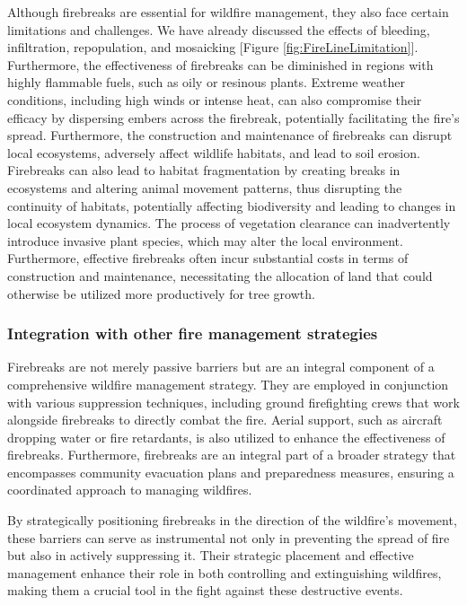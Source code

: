 \documentclass[
  12 pt,
]{Nemilov}
\begin{document}
Although firebreaks are essential for wildfire management, they also face certain limitations and challenges. We have already discussed the effects of bleeding, infiltration, repopulation, and mosaicking {[}Figure \ref{fig:FireLineLimitation}{]}. Furthermore, the effectiveness of firebreaks can be diminished in regions with highly flammable fuels, such as oily or resinous plants. Extreme weather conditions, including high winds or intense heat, can also compromise their efficacy by dispersing embers across the firebreak, potentially facilitating the fire's spread. Furthermore, the construction and maintenance of firebreaks can disrupt local ecosystems, adversely affect wildlife habitats, and lead to soil erosion. Firebreaks can also lead to habitat fragmentation by creating breaks in ecosystems and altering animal movement patterns, thus disrupting the continuity of habitats, potentially affecting biodiversity and leading to changes in local ecosystem dynamics. The process of vegetation clearance can inadvertently introduce invasive plant species, which may alter the local environment. Furthermore, effective firebreaks often incur substantial costs in terms of construction and maintenance, necessitating the allocation of land that could otherwise be utilized more productively for tree growth.

\subsubsection{Integration with other fire management strategies}\label{integration-with-other-fire-management-strategies}

Firebreaks are not merely passive barriers but are an integral component of a comprehensive wildfire management strategy. They are employed in conjunction with various suppression techniques, including ground firefighting crews that work alongside firebreaks to directly combat the fire. Aerial support, such as aircraft dropping water or fire retardants, is also utilized to enhance the effectiveness of firebreaks. Furthermore, firebreaks are an integral part of a broader strategy that encompasses community evacuation plans and preparedness measures, ensuring a coordinated approach to managing wildfires.

By strategically positioning firebreaks in the direction of the wildfire's movement, these barriers can serve as instrumental not only in preventing the spread of fire but also in actively suppressing it. Their strategic placement and effective management enhance their role in both controlling and extinguishing wildfires, making them a crucial tool in the fight against these destructive events.
\end{document}
